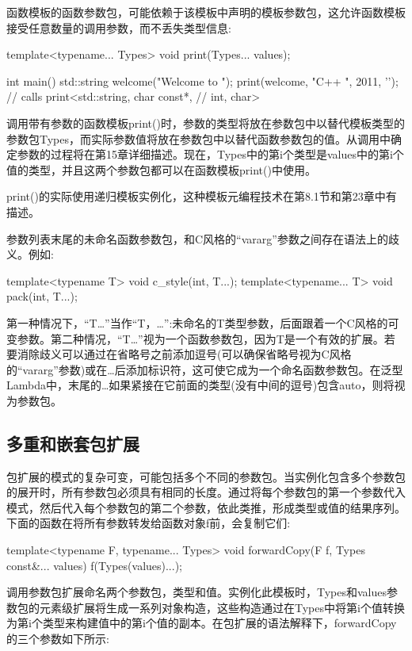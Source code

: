 函数模板的函数参数包，可能依赖于该模板中声明的模板参数包，这允许函数模板接受任意数量的调用参数，而不丢失类型信息:

\begin{cpp}
template<typename... Types>
void print(Types... values);

int main()
{
	std::string welcome("Welcome to ");
	print(welcome, "C++ ", 2011, ’\n’); // calls print<std::string, char const*,
} // int, char>
\end{cpp}

调用带有参数的函数模板print()时，参数的类型将放在参数包中以替代模板类型的参数包Types，而实际参数值将放在参数包中以替代函数参数包的值。从调用中确定参数的过程将在第15章详细描述。现在，Types中的第i个类型是values中的第i个值的类型，并且这两个参数包都可以在函数模板print()中使用。

print()的实际使用递归模板实例化，这种模板元编程技术在第8.1节和第23章中有描述。

参数列表末尾的未命名函数参数包，和C风格的“vararg”参数之间存在语法上的歧义。例如:

\begin{cpp}
template<typename T> void c_style(int, T...);
template<typename... T> void pack(int, T...);
\end{cpp}

第一种情况下，“T…”当作“T，…”:未命名的T类型参数，后面跟着一个C风格的可变参数。第二种情况，“T…”视为一个函数参数包，因为T是一个有效的扩展。若要消除歧义可以通过在省略号之前添加逗号(可以确保省略号视为C风格的“vararg”参数)或在…后添加标识符，这可使它成为一个命名函数参数包。在泛型Lambda中，末尾的…如果紧接在它前面的类型(没有中间的逗号)包含auto，则将视为参数包。

\subsection{多重和嵌套包扩展}

包扩展的模式的复杂可变，可能包括多个不同的参数包。当实例化包含多个参数包的展开时，所有参数包必须具有相同的长度。通过将每个参数包的第一个参数代入模式，然后代入每个参数包的第二个参数，依此类推，形成类型或值的结果序列。下面的函数在将所有参数转发给函数对象f前，会复制它们:

\begin{cpp}
template<typename F, typename... Types>
void forwardCopy(F f, Types const&... values) {
	f(Types(values)...);
}
\end{cpp}

调用参数包扩展命名两个参数包，类型和值。实例化此模板时，Types和values参数包的元素级扩展将生成一系列对象构造，这些构造通过在Types中将第i个值转换为第i个类型来构建值中的第i个值的副本。在包扩展的语法解释下，forwardCopy的三个参数如下所示:

